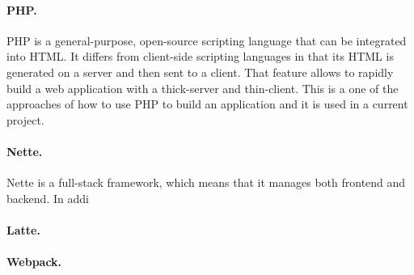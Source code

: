\paragraph*{PHP.} PHP is a general-purpose, open-source scripting language that can be integrated into HTML. It differs from client-side scripting languages in that its HTML is generated on a server and then sent to a client. That feature allows to rapidly build a web application with a thick-server and thin-client. This is a one of the approaches of how to use PHP to build an application and it is used in a current project.
\paragraph*{Nette.} Nette is a full-stack framework, which means that it manages both frontend and backend. In addi

\paragraph*{Latte.} 

\paragraph*{Webpack.}








